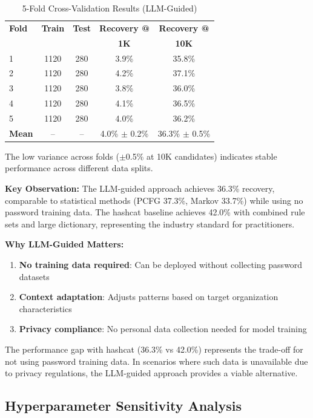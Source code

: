 \documentclass[preprint,12pt]{elsarticle}
\begin{document}
\begin{table}[htbp]
\centering
\caption{5-Fold Cross-Validation Results (LLM-Guided)}
\label{tab:crossval}
\begin{tabular}{lcccc}
\toprule
\textbf{Fold} & \textbf{Train} & \textbf{Test} & \textbf{Recovery @} & \textbf{Recovery @} \\
& & & \textbf{1K} & \textbf{10K} \\
\midrule
1 & 1120 & 280 & 3.9\% & 35.8\% \\
2 & 1120 & 280 & 4.2\% & 37.1\% \\
3 & 1120 & 280 & 3.8\% & 36.0\% \\
4 & 1120 & 280 & 4.1\% & 36.5\% \\
5 & 1120 & 280 & 4.0\% & 36.2\% \\
\midrule
\textbf{Mean} & -- & -- & 4.0\% $\pm$ 0.2\% & 36.3\% $\pm$ 0.5\% \\
\bottomrule
\end{tabular}
\end{table}

The low variance across folds ($\pm$0.5\% at 10K candidates) indicates stable performance across different data splits.

\textbf{Key Observation:} The LLM-guided approach achieves 36.3\% recovery, comparable to statistical methods (PCFG 37.3\%, Markov 33.7\%) while using no password training data. The hashcat baseline achieves 42.0\% with combined rule sets and large dictionary, representing the industry standard for practitioners.

\textbf{Why LLM-Guided Matters:}
\begin{enumerate}
    \item \textbf{No training data required}: Can be deployed without collecting password datasets
    \item \textbf{Context adaptation}: Adjusts patterns based on target organization characteristics
    \item \textbf{Privacy compliance}: No personal data collection needed for model training
\end{enumerate}

The performance gap with hashcat (36.3\% vs 42.0\%) represents the trade-off for not using password training data. In scenarios where such data is unavailable due to privacy regulations, the LLM-guided approach provides a viable alternative.

\subsection{Hyperparameter Sensitivity Analysis}
\label{sec:sensitivity}
\end{document}
